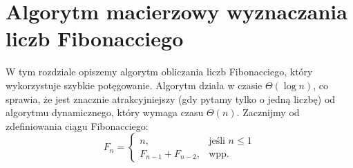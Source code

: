 \section{Algorytm macierzowy wyznaczania liczb Fibonacciego}

\label{sec:fibonacci}

W tym rozdziale opiszemy algorytm obliczania liczb Fibonacciego, który wykorzystuje szybkie potęgowanie.
Algorytm działa w czasie $\Theta(\log{n})$, co sprawia, że jest znacznie atrakcyjniejszy (gdy pytamy tylko o jedną liczbę) od algorytmu dynamicznego, który wymaga czasu $\Theta(n)$.
Zacznijmy od zdefiniowania ciągu Fibonacciego:
\begin{equation*}
  F_n=\begin{cases}
    n, & \text{jeśli $n \leq1$}\\
    F_{n-1} + F_{n-2}, & \text{wpp.}
  \end{cases}
\end{equation*}

